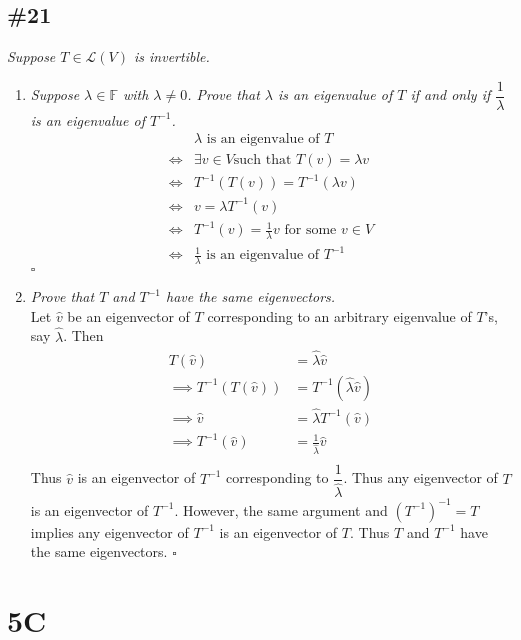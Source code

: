 \documentclass[12pt]{article}
\begin{document}
\subsection*{\#21}
{\it Suppose $T \in \mathcal{L}(V)$ is invertible.}
	\begin{enumerate}[\it\ \ (a)\ \ ]
		\item {\it Suppose $\lambda \in \mathbb{F}$ with $\lambda \neq 0$.  Prove that $\lambda$ is an eigenvalue of $T$ if and only if $\dfrac{1}{\lambda}$ is an eigenvalue of $T^{-1}$.} \\
		\begin{align*}
			&\lambda \text{ is an eigenvalue of }T \\[.1cm]
			\iff &\exists v \in V \text{such that }T(v) = \lambda v \\[.1cm]
			\iff &T^{-1}(T(v)) = T^{-1}(\lambda v) \\[.1cm]
			\iff &v = \lambda T^{-1}(v) \\[.1cm]
			\iff &T^{-1}(v) = \frac{1}{\lambda}v \text{ for some $v \in V$}\\[.1cm]
			\iff &\frac{1}{\lambda} \text{ is an eigenvalue of }T^{-1}
		\end{align*}\hfill $\square$
		\item {\it Prove that $T$ and $T^{-1}$ have the same eigenvectors.} \\
		
		\noindent Let $\hat{v}$ be an eigenvector of $T$ corresponding to an arbitrary eigenvalue of $T$'s, say $\hat{\lambda}$.  Then
		\begin{align*}
			T(\hat{v}) &= \hat{\lambda}\hat{v} \\
			\implies T^{-1}(T(\hat{v})) &= T^{-1}(\hat{\lambda}\hat{v}) \\
			\implies \hat{v} &= \hat{\lambda}T^{-1}(\hat{v}) \\
			\implies T^{-1}(\hat{v}) &= \frac{1}{\hat{\lambda}}\hat{v} \\
		\end{align*}
		Thus $\hat{v}$ is an eigenvector of $T^{-1}$ corresponding to $\dfrac{1}{\hat{\lambda}}$.  Thus any eigenvector of $T$ is an eigenvector of $T^{-1}$.  However, the same argument and $(T^{-1})^{-1} = T$ implies any eigenvector of $T^{-1}$ is an eigenvector of $T$.  Thus $T$ and $T^{-1}$ have the same eigenvectors. \hfill $\square$
	\end{enumerate}
\section*{5C}
\end{document}
